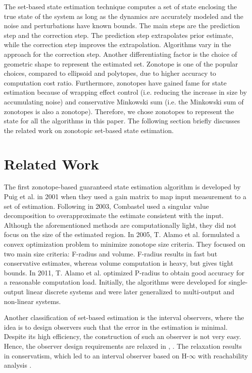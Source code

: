 The set-based state estimation technique computes a set of state enclosing the true state of the system as long as the dynamics are accurately modeled and the noise and perturbations have known bounds. The main steps are the prediction step and the correction step. The prediction step extrapolates prior estimate, while the correction step improves the extrapolation. Algorithms vary in the approach for the correction step. Another differentiating factor is the choice of geometric shape to represent the estimated set. Zonotope is one of the popular choices, compared to ellipsoid and polytopes, due to higher accuracy to computation cost ratio. Furthermore, zonotopes have gained fame for state estimation because of wrapping effect control (i.e. reducing the increase in size by accumulating noise) and conservative Minkowski sum (i.e. the Minkowski sum of zonotopes is also a zonotope). Therefore, we chose zonotopes to represent the state for all the algorithms in this paper. The following section briefly discusses the related work on zonotopic set-based state estimation.


\section{Related Work}
The first zonotope-based guaranteed state estimation algorithm is developed by Puig et al. in 2001 \cite{Puig2001} when they used a gain matrix to map input measurement to a set of estimation. Following in 2003, Combastel \cite{Combastel2003} used a singular value decomposition to overapproximate the estimate consistent with the input. Although the aforementioned methods are computationally light, they did not focus on the size of the estimated region. In 2005, T. Alamo et al. \cite{Alamo2005} formulated a convex optimization problem to minimize zonotope size criteria. They focused on two main size criteria: F-radius and volume. F-radius results in fast but conservative estimates, whereas volume computation is heavy, but gives tight bounds. In 2011, T. Alamo et al. \cite{Le2012} optimized P-radius to obtain good accuracy for a reasonable computation load. Initially, the algorithms were developed for single-output linear discrete systems and were later generalized to multi-output and non-linear systems.  

Another classification of set-based estimation is the interval observers, where the idea is to design observers such that the error in the estimation is minimal. Despite its high efficiency, the construction of such an observer is not very easy. Hence, the observer design requirements are relaxed in  \cite{Mazenc2011}, \cite{Raissi2012}. The relaxation results in conservatism, which led to an interval observer based on H-$\infty$ with reachability analysis \cite{Tang2019}.

